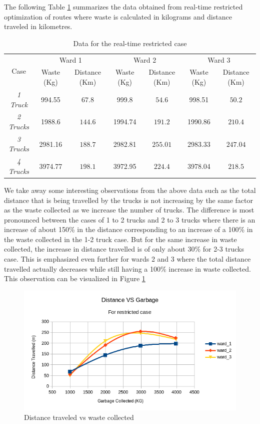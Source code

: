 \documentclass[12pt]{article}
\begin{document}
The following Table \ref{tab1} summarizes the data obtained from real-time restricted optimization of routes where waste is calculated in kilograms and distance traveled in kilometres.
\begin{table}[H]
    \centering
    \caption{Data for the real-time restricted case} \label{tab1}
    \vspace*{0.3cm}
    \begin{tabular}{|c|c|c|c|c|c|c|}
        \hline \multirow{2}{*}{Case} & \multicolumn{2}{c|}{Ward 1} & \multicolumn{2}{c|}{Ward 2} & \multicolumn{2}{c|}{Ward 3}\\
        \cline{2-7}& Waste (Kg)  & Distance (Km) & Waste (Kg) & Distance (Km) & Waste (Kg) & Distance (Km)\\ 
        \hline \textit{1 Truck} & 994.55 & $67.8$ & 999.8 & $54.6$ & 998.51 & $50.2$ \\
        \hline \textit{2 Trucks} & 1988.6 & $144.6$ & 1994.74 & $191.2$ & 1990.86 & $210.4$ \\
        \hline \textit{3 Trucks} & 2981.16 & $188.7$ & 2982.81 & $255.01$ & 2983.33 & $247.04$ \\
        \hline \textit{4 Trucks} & 3974.77 & $198.1$ & 3972.95 & $224.4$ & 3978.04 & $218.5$ \\
        \hline
    \end{tabular}
\end{table}
We take away some interesting observations from the above data such as the total distance that is being travelled by the trucks is not increasing by the same factor as the waste collected as we increase the number of trucks. The difference is most pronounced between the cases of 1 to 2 trucks and 2 to 3 trucks where there is an increase of about 150\% in the distance corresponding to an increase of a 100\% in the waste collected in the 1-2 truck case. But for the same increase in waste collected, the increase in distance travelled is of only about 30\% for 2-3 trucks case. This is emphasized even further for wards 2 and 3 where the total distance travelled actually decreases while still having a 100\% increase in waste collected. This observation can be visualized in Figure \ref{figz}
\begin{figure}[H]
    \centering
    \includegraphics[scale=0.7]{distance_VS_garbage_restricted.png}
    \caption{Distance traveled vs waste collected}\label{figz}
\end{figure}
\end{document}
